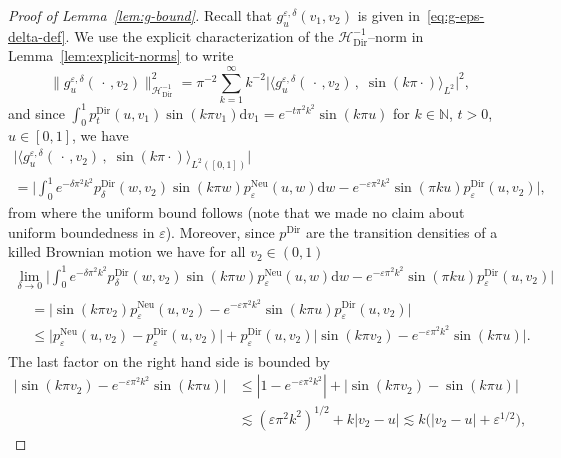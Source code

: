 \documentclass[10pt]{amsart}
\theoremstyle{definition}\newtheorem{defi}[theo]{Definition}\newtheorem{rema}[theo]{Remark}\newtheorem{exam}[theo]{Example}\newtheorem{exem}[theo]{Example}\newtheorem{nota}[theo]{Notation}
\DeclareMathOperator{\Dir}{Dir}
\DeclareMathOperator{\Neu}{Neu}
\newcommand{\bb}[1]{{\mathbb #1}}
\newcommand{\mc}[1]{{\mathcal #1}}
\renewcommand{\mc}[1]{{\mathcal #1}}
\renewcommand{\leq}{\leqslant}
\newcommand*{\dd}{\mathrm{d}}
\newcommand*{\dv}{\dd v}
\newcommand*{\dw}{\dd w}
\begin{document}
\begin{proof}[Proof of Lemma~\ref{lem:g-bound}]
Recall that $g^{\varepsilon, \delta}_u (v_1, v_2)$ is given in~\eqref{eq:g-eps-delta-def}. We use the explicit characterization of the $\mc H_{\Dir}^{- 1}$--norm in Lemma~\ref{lem:explicit-norms} to write
\[
\big\| g^{\varepsilon, \delta}_u (\,\cdot\,, v_2) \big\|_{\mc H_{\Dir}^{- 1}}^2 = \pi^{-2}
\sum_{k = 1}^{\infty} k^{- 2} \big| \big\langle g^{\varepsilon, \delta}_u (\,\cdot\,, v_2) \,,\; \sin (k \pi \cdot) \big\rangle_{L^2} \big|^2,
\]
and since $\int_0^1 p^{\Dir}_{t} (u, v_1) \sin (k \pi v_1) \dv_1 = e^{- t \pi^2 k^2} \sin (k \pi u)$ for $k \in \bb N$, $t > 0$, $u \in [0,1]$, we have
\begin{multline*}
\big| \big\langle g^{\varepsilon, \delta}_u (\,\cdot\,, v_2) \,, \; \sin (k \pi \cdot) \big\rangle_{L^2([0,1])} \big| \\ = \bigg| \int_0^1 e^{- \delta \pi^2 k^2} p^{\Dir}_{\delta} (w, v_2) \sin (k \pi w) p^{\Neu}_{\varepsilon} (u, w) \dw - e^{- \varepsilon \pi^2 k^2} \sin(\pi k u) p^{\Dir}_{\varepsilon} (u, v_2) \bigg|,
\end{multline*}
from where the uniform bound follows (note that we made no claim about uniform boundedness in $\varepsilon$). Moreover, since $p^{\Dir}$ are the transition densities of a killed Brownian motion we have for all $v_2 \in (0,1)$
\begin{multline*}
\lim_{\delta \rightarrow 0} \bigg| \int_0^1 e^{- \delta \pi^2 k^2} p^{\Dir}_{\delta} (w, v_2) \sin (k \pi w) p^{\Neu}_{\varepsilon} (u, w) \dw - e^{- \varepsilon \pi^2 k^2} \sin(\pi k u) p^{\Dir}_{\varepsilon} (u, v_2) \bigg|\\
\begin{aligned}
&= \bigg| \sin (k \pi v_2) p^{\Neu}_{\varepsilon} (u, v_2) - e^{- \varepsilon
\pi^2 k^2} \sin (k \pi u) p^{\Dir}_{\varepsilon} (u, v_2) \bigg|\\
&\leq \big| p^{\Neu}_{\varepsilon} (u, v_2) - p^{\Dir}_{\varepsilon} (u, v_2) \big| + p^{\Dir}_{\varepsilon} (u, v_2) \big| \sin (k \pi v_2) - e^{- \varepsilon \pi^2 k^2} \sin (k \pi u)\big|.
\end{aligned}
\end{multline*}
The last factor on the right hand side is bounded by
\begin{align*}
\big| \sin (k \pi v_2) - e^{- \varepsilon \pi^2 k^2} \sin (k \pi u)\big| & \leq |1 - e^{- \varepsilon \pi^2 k^2}| + \big| \sin (k \pi v_2) - \sin (k \pi u) \big|\\
& \lesssim (\varepsilon \pi^2 k^2)^{1/2} + k |v_2 - u| \lesssim k \big(| v_2 - u | + \varepsilon^{1/2}\big),

\end{align*}
\end{proof}
\end{document}

